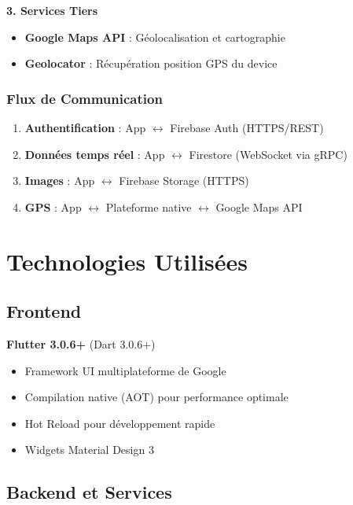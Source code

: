 \documentclass[11pt,a4paper]{article}
\begin{document}
\textbf{3. Services Tiers}
\begin{itemize}
    \item \textbf{Google Maps API} : Géolocalisation et cartographie
    \item \textbf{Geolocator} : Récupération position GPS du device
\end{itemize}

\subsubsection{Flux de Communication}

\begin{enumerate}
    \item \textbf{Authentification} : App $\leftrightarrow$ Firebase Auth (HTTPS/REST)
    \item \textbf{Données temps réel} : App $\leftrightarrow$ Firestore (WebSocket via gRPC)
    \item \textbf{Images} : App $\leftrightarrow$ Firebase Storage (HTTPS)
    \item \textbf{GPS} : App $\leftrightarrow$ Plateforme native $\leftrightarrow$ Google Maps API
\end{enumerate}

\section{Technologies Utilisées}

\subsection{Frontend}

\begin{tcolorbox}[colback=secondarycolor!5,colframe=secondarycolor]
\textbf{Flutter 3.0.6+} (Dart 3.0.6+)
\begin{itemize}
    \item Framework UI multiplateforme de Google
    \item Compilation native (AOT) pour performance optimale
    \item Hot Reload pour développement rapide
    \item Widgets Material Design 3
\end{itemize}
\end{tcolorbox}

\subsection{Backend et Services}
\end{document}
